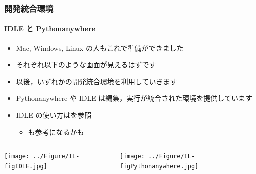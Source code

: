 \begin{frame}
\frametitle{開発統合環境}
\framesubtitle{IDLE と Pythonanywhere}
  \begin{itemize}
\item Mac, Windows, Linux の人もこれで準備ができました
\item それぞれ以下のような画面が見えるはずです
\item 以後，いずれかの開発統合環境を利用していきます
\item Pythonanywhere や IDLE は編集，実行が統合された環境を提供しています
\item IDLE の使い方は\href{https://docs.python.org/ja/3/library/idle.html?highlight=idle}{}を参照
    \begin{itemize}
\item \href{http://www.isc.meiji.ac.jp/~mizutani/python/intro1_python.html}{}も参考になるかも
    \end{itemize}
  \end{itemize}
  \begin{columns}[c]
    \begin{column}{5cm}
\texttt{[image: ../Figure/IL-figIDLE.jpg]}
    \end{column}
    \begin{column}{5cm}
\texttt{[image: ../Figure/IL-figPythonanywhere.jpg]}
    \end{column}
  \end{columns}
\end{frame}
